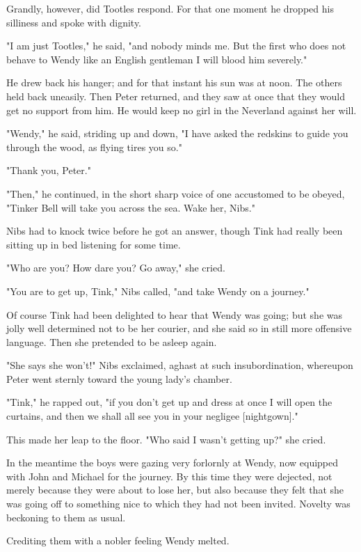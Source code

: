 Grandly, however, did Tootles respond. For that one moment he dropped his
silliness and spoke with dignity.


"I am just Tootles," he said, "and nobody minds me. But the first who does
not behave to Wendy like an English gentleman I will blood him severely."


He drew back his hanger; and for that instant his sun was at noon. The
others held back uneasily. Then Peter returned, and they saw at once that
they would get no support from him. He would keep no girl in the Neverland
against her will.


"Wendy," he said, striding up and down, "I have asked the redskins to
guide you through the wood, as flying tires you so."


"Thank you, Peter."


"Then," he continued, in the short sharp voice of one accustomed to be
obeyed, "Tinker Bell will take you across the sea. Wake her, Nibs."


Nibs had to knock twice before he got an answer, though Tink had really
been sitting up in bed listening for some time.


"Who are you? How dare you? Go away," she cried.


"You are to get up, Tink," Nibs called, "and take Wendy on a journey."


Of course Tink had been delighted to hear that Wendy was going; but she
was jolly well determined not to be her courier, and she said so in still
more offensive language. Then she pretended to be asleep again.


"She says she won't!" Nibs exclaimed, aghast at such insubordination,
whereupon Peter went sternly toward the young lady's chamber.


"Tink," he rapped out, "if you don't get up and dress at once I will open
the curtains, and then we shall all see you in your negligee [nightgown]."


This made her leap to the floor. "Who said I wasn't getting up?" she
cried.


In the meantime the boys were gazing very forlornly at Wendy, now equipped
with John and Michael for the journey. By this time they were dejected,
not merely because they were about to lose her, but also because they felt
that she was going off to something nice to which they had not been
invited. Novelty was beckoning to them as usual.


Crediting them with a nobler feeling Wendy melted.


